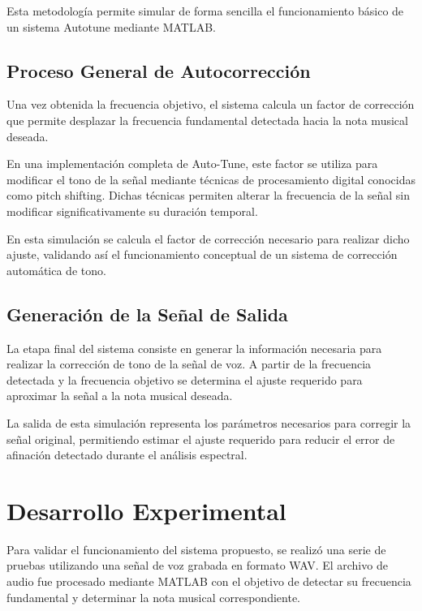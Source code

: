 \documentclass[12pt]{article}
\begin{document}
Esta metodología permite simular de forma sencilla el funcionamiento básico de un sistema Autotune mediante MATLAB.



\subsection{Proceso General de Autocorrección}

Una vez obtenida la frecuencia objetivo, el sistema calcula un factor de corrección que permite desplazar la frecuencia fundamental detectada hacia la nota musical deseada.

En una implementación completa de Auto-Tune, este factor se utiliza para modificar el tono de la señal mediante técnicas de procesamiento digital conocidas como pitch shifting. Dichas técnicas permiten alterar la frecuencia de la señal sin modificar significativamente su duración temporal.

En esta simulación se calcula el factor de corrección necesario para realizar dicho ajuste, validando así el funcionamiento conceptual de un sistema de corrección automática de tono.


\subsection{Generación de la Señal de Salida}

La etapa final del sistema consiste en generar la información necesaria para realizar la corrección de tono de la señal de voz. A partir de la frecuencia detectada y la frecuencia objetivo se determina el ajuste requerido para aproximar la señal a la nota musical deseada.

La salida de esta simulación representa los parámetros necesarios para corregir la señal original, permitiendo estimar el ajuste requerido para reducir el error de afinación detectado durante el análisis espectral.


\section{Desarrollo Experimental}

Para validar el funcionamiento del sistema propuesto, se realizó una serie de pruebas utilizando una señal de voz grabada en formato WAV. El archivo de audio fue procesado mediante MATLAB con el objetivo de detectar su frecuencia fundamental y determinar la nota musical correspondiente.
\end{document}
